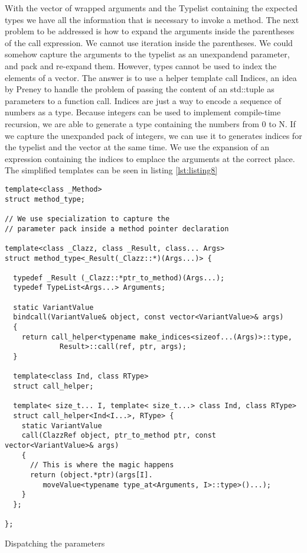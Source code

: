 With the vector of wrapped arguments and the Typelist containing the expected types we have all the information that is necessary to
invoke a method. The next problem to be addressed is how to expand the arguments inside the parentheses of the call expression.
We cannot use iteration inside the parentheses. We could somehow capture the arguments to the typelist as an unexpandend parameter,
and pack and re-expand them. However, types cannot be used to index the elements of a vector. The answer is to use a helper template
call Indices, an idea by Preney\cite{preney} to handle the problem of passing the content of an std::tuple as parameters to a function
call. Indices are just a way to encode a sequence of numbers as a type. Because integers can be used to implement compile-time recursion,
we are able to generate a type containing the numbers from 0 to N. If we capture the unexpanded pack of integers, we can use it to
generates indices for the typelist and the vector at the same time. We use the expansion of an expression containing the indices to
emplace the arguments at the correct place. The simplified templates can be seen in listing \ref{lst:listing8}

\begin{listing}[H]
\begin{verbatim}
template<class _Method>
struct method_type;

// We use specialization to capture the
// parameter pack inside a method pointer declaration

template<class _Clazz, class _Result, class... Args>
struct method_type<_Result(_Clazz::*)(Args...)> {
  
  typedef _Result (_Clazz::*ptr_to_method)(Args...);
  typedef TypeList<Args...> Arguments;

  static VariantValue
  bindcall(VariantValue& object, const vector<VariantValue>& args)
  {
    return call_helper<typename make_indices<sizeof...(Args)>::type,
             Result>::call(ref, ptr, args);
  }

  template<class Ind, class RType>
  struct call_helper;

  template< size_t... I, template< size_t...> class Ind, class RType>
  struct call_helper<Ind<I...>, RType> {
    static VariantValue
    call(ClazzRef object, ptr_to_method ptr, const vector<VariantValue>& args)
    {
      // This is where the magic happens
      return (object.*ptr)(args[I].
         moveValue<typename type_at<Arguments, I>::type>()...);
    }
  };

};
\end{verbatim}
\caption{Dispatching the parameters}
\label{lst:listing8}
\end{listing}

